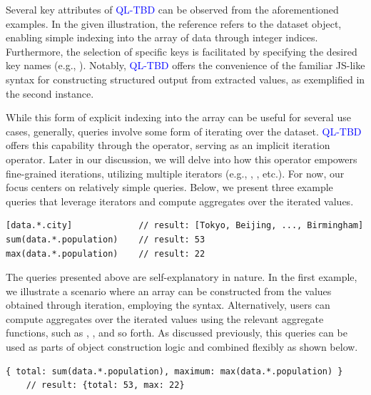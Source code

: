 \documentclass[runningheads]{llncs}
\newcommand{\lang}{\textcolor{blue}{QL-TBD}}
\begin{document}
Several key attributes of \lang{} can be observed from the aforementioned examples.
In the given illustration, the reference  refers to
the dataset object, enabling simple indexing into the array of data through integer
indices.
Furthermore, the selection of specific keys is facilitated by specifying the desired
key names (e.g., ).
Notably, \lang{} offers the convenience of the familiar JS-like syntax for constructing
structured output from extracted values, as exemplified in the second instance.

While this form of explicit indexing into the array can be useful for several
use cases, generally, queries involve some form of iterating over the dataset.
\lang{} offers this capability through the \inline{*} operator,
serving as an implicit iteration operator.
Later in our discussion, we will delve into how this operator empowers fine-grained
iterations, utilizing multiple iterators
(e.g., , , etc.).
For now, our focus centers on relatively simple queries.
Below, we present three example queries that leverage iterators and compute
aggregates over the iterated values.

\begin{lstlisting}[style=JavaScript, columns=flexible]
[data.*.city]             // result: [Tokyo, Beijing, ..., Birmingham]
sum(data.*.population)    // result: 53
max(data.*.population)    // result: 22
\end{lstlisting}

The queries presented above are self-explanatory in nature.
In the first example, we illustrate a scenario where an array can be constructed
from the values obtained through iteration, employing the \inline{[...]} syntax.
Alternatively, users can compute aggregates over the iterated values using the
relevant aggregate functions, such as , , and so forth.
As discussed previously, this queries can be used as parts of object
construction logic and combined flexibly as shown below.

\begin{lstlisting}[style=JavaScript, columns=flexible, numbers=none]
    { total: sum(data.*.population), maximum: max(data.*.population) }
    // result: {total: 53, max: 22}
    \end{lstlisting}

\end{document}
